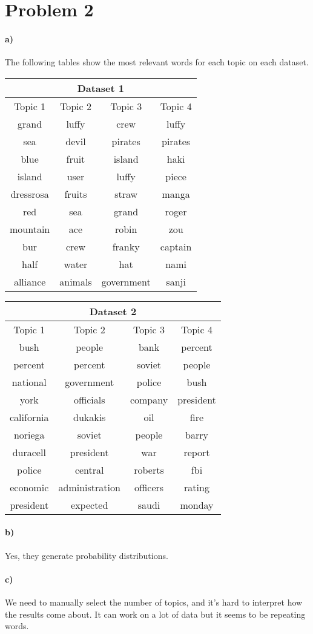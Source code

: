 \documentclass[12pt]{article}
\begin{document}
\section*{Problem 2}

\paragraph{a)}

The following tables show the most relevant words for each topic on each dataset.
\begin{center}
    \begin{tabular}{cccc}
        \multicolumn{4}{c}{Dataset 1} \\
        \hline
        Topic 1 & Topic 2 & Topic 3 & Topic 4\\
        \hline
        grand & luffy & crew & luffy\\
        sea & devil & pirates & pirates\\
        blue & fruit & island & haki\\
        island & user & luffy & piece\\
        dressrosa & fruits & straw & manga\\
        red & sea & grand & roger\\
        mountain & ace & robin & zou\\
        bur & crew & franky & captain\\
        half & water & hat & nami\\
        alliance & animals & government & sanji
    \end{tabular}
\end{center}
\begin{center}
    \begin{tabular}{cccc}
        \multicolumn{4}{c}{Dataset 2} \\
        \hline
        Topic 1 & Topic 2 & Topic 3 & Topic 4\\
        \hline
        bush & people & bank & percent\\
        percent & percent & soviet & people\\
        national & government & police & bush\\
        york & officials & company & president\\
        california & dukakis & oil & fire\\
        noriega & soviet & people & barry\\
        duracell & president & war & report\\
        police & central & roberts & fbi\\
        economic & administration & officers & rating\\
        president & expected & saudi & monday
    \end{tabular}
\end{center}

\paragraph{b)}

Yes, they generate probability distributions.

\paragraph{c)}

We need to manually select the number of topics, and it's hard to interpret how the results
come about. It can work on a lot of data but it seems to be repeating words.
\end{document}
